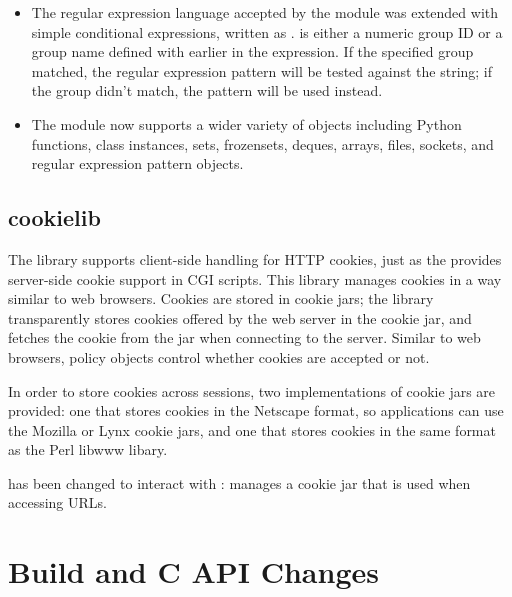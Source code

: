 \documentclass{howto}
\begin{document}
\begin{itemize}
\item The regular expression language accepted by the  module
   was extended with simple conditional expressions, written as
   .   is either a
   numeric group ID or a group name defined with  
   earlier in the expression.  If the specified group matched, the
   regular expression pattern  will be tested against the string; if
   the group didn't match, the pattern  will be used instead.

\item The  module now supports a wider variety of objects
   including Python functions, class instances, sets, frozensets, deques,
   arrays, files, sockets, and regular expression pattern objects.
   
\end{itemize}



\subsection{cookielib}

The  library supports client-side handling for HTTP
cookies, just as the  provides server-side cookie
support in CGI scripts. This library manages cookies in a way similar
to web browsers. Cookies are stored in cookie jars; the library
transparently stores cookies offered by the web server in the cookie
jar, and fetches the cookie from the jar when connecting to the
server. Similar to web browsers, policy objects control whether
cookies are accepted or not.

In order to store cookies across sessions, two implementations of
cookie jars are provided: one that stores cookies in the Netscape
format, so applications can use the Mozilla or Lynx cookie jars, and
one that stores cookies in the same format as the Perl libwww libary.

 has been changed to interact with :
 manages a cookie jar that is used when
accessing URLs.

\section{Build and C API Changes}
\end{document}
